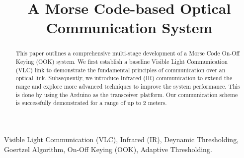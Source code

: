 \documentclass[conference]{IEEEtran}
\begin{document}
\title{A Morse Code-based Optical Communication System}

\author{
    
}

\maketitle

\begin{abstract}
This paper outlines a comprehensive multi-stage development of a Morse Code On-Off Keying (OOK) system. We first establish a baseline Visible Light Communication (VLC) link to demonstrate the fundamental principles of communication over an optical link.  
Subsequently, 
we introduce 
Infrared (IR) 
communication to extend the range and explore more advanced techniques to improve the system performance. 
This is done by using the Arduino as the transceiver platform.  Our communication scheme is successfully demonstrated for a range of up to 2 meters.
\end{abstract}

\begin{IEEEkeywords}
Visible Light Communication (VLC), Infrared (IR), Deynamic Thresholding, Goertzel Algorithm, On-Off Keying (OOK), Adaptive Thresholding.
\end{IEEEkeywords}
\end{document}
